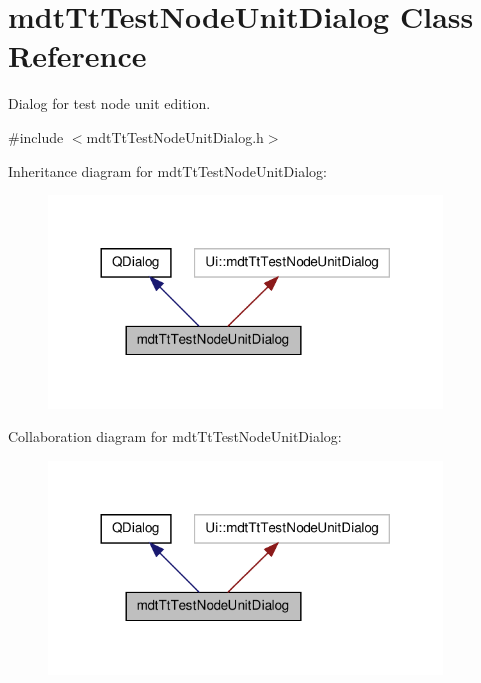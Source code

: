 \hypertarget{classmdt_tt_test_node_unit_dialog}{\section{mdt\-Tt\-Test\-Node\-Unit\-Dialog Class Reference}
\label{classmdt_tt_test_node_unit_dialog}
}


Dialog for test node unit edition.  




{\ttfamily \#include $<$mdt\-Tt\-Test\-Node\-Unit\-Dialog.\-h$>$}



Inheritance diagram for mdt\-Tt\-Test\-Node\-Unit\-Dialog\-:
\nopagebreak
\begin{figure}[H]
\begin{center}
\leavevmode
\includegraphics[width=296pt]{classmdt_tt_test_node_unit_dialog__inherit__graph}
\end{center}
\end{figure}


Collaboration diagram for mdt\-Tt\-Test\-Node\-Unit\-Dialog\-:
\nopagebreak
\begin{figure}[H]
\begin{center}
\leavevmode
\includegraphics[width=296pt]{classmdt_tt_test_node_unit_dialog__coll__graph}
\end{center}
\end{figure}
